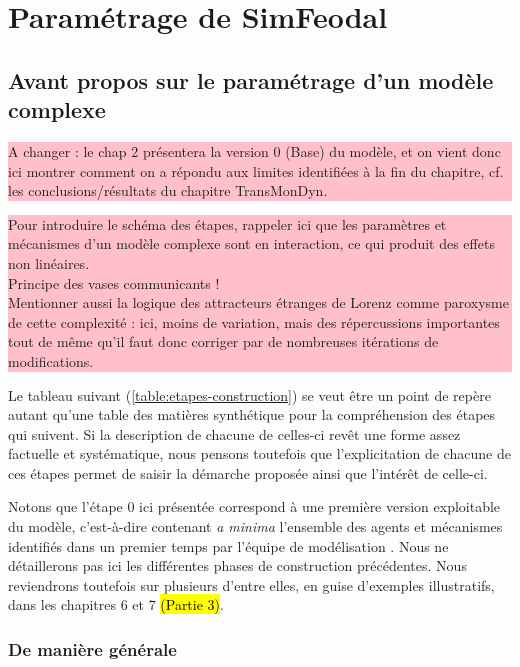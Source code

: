 \section{Paramétrage de SimFeodal}
	
	\subsection{Avant propos sur le paramétrage d'un modèle complexe}
	
		\colorbox{pink}{\parbox{0.9\textwidth}{%
			\vskip5pt
			A changer : le chap 2 présentera la version 0 (Base) du modèle, et on vient donc ici montrer comment on a répondu aux limites identifiées à la fin du chapitre, cf. les conclusions/résultats du chapitre TransMonDyn.
			\vskip5pt
		}
	}
\medbreak
	
		\colorbox{pink}{\parbox{0.9\textwidth}{%
			\vskip5pt
			Pour introduire le schéma des étapes, rappeler ici que les paramètres et mécanismes d'un modèle complexe sont en interaction, ce qui produit des effets non linéaires.\\
			Principe des vases communicants !\\
			Mentionner aussi la logique des attracteurs étranges de Lorenz comme paroxysme de cette complexité : ici, moins de variation, mais des répercussions importantes tout de même qu'il faut donc \og corriger\fg{} par de nombreuses itérations de modifications.
			\vskip5pt
		}
	}

Le tableau suivant (\cref{table:etapes-construction}) se veut être un point de repère autant qu'une table des matières synthétique pour la compréhension des étapes qui suivent. Si la description de chacune de celles-ci revêt une forme assez factuelle et systématique, nous pensons toutefois que l'explicitation de chacune de ces étapes permet de saisir la démarche proposée ainsi que l'intérêt de celle-ci.

Notons que l'étape 0 ici présentée correspond à une première version \og exploitable\fg{} du modèle, c'est-à-dire contenant \textit{a minima} l'ensemble des agents et mécanismes identifiés dans un premier temps par l'équipe de modélisation \autocite{tannier_ontologie_2014-2}. Nous ne détaillerons pas ici les différentes phases de construction précédentes. Nous reviendrons toutefois sur plusieurs d'entre elles, en guise d'exemples illustratifs, dans les chapitres 6 et 7 \hl{(Partie 3)}.

	\subsubsection{De manière générale}
	
